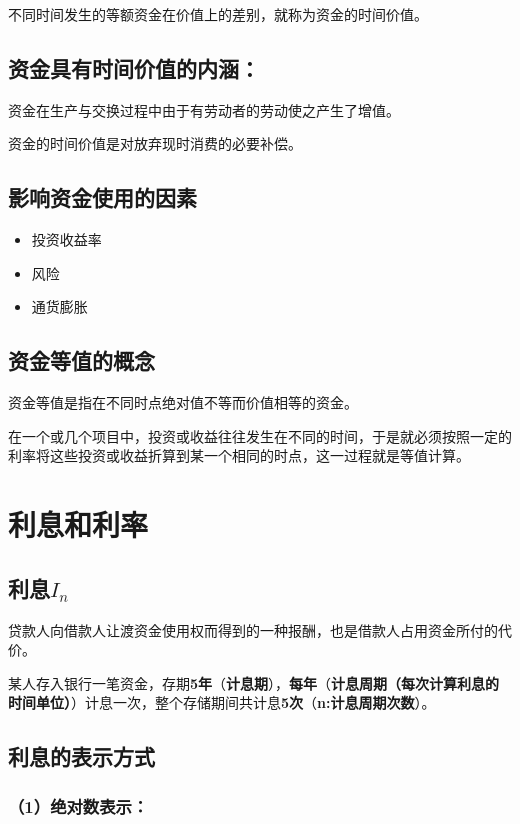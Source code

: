 \documentclass[12pt, a4paper, oneside]{ctexbook}
\begin{document}
不同时间发生的等额资金在价值上的差别，就称为资金的时间价值。

\subsection{资金具有时间价值的内涵：}

资金在生产与交换过程中由于有劳动者的劳动使之产生了增值。

资金的时间价值是对放弃现时消费的必要补偿。

\subsection{影响资金使用的因素}

\begin{itemize}
    \item 投资收益率
    \item 风险
    \item 通货膨胀
\end{itemize}

\subsection{资金等值的概念}

资金等值是指在不同时点绝对值不等而价值相等的资金。

在一个或几个项目中，投资或收益往往发生在不同的时间，于是就必须按照一定的利率将这些投资或收益折算到某一个相同的时点，这一过程就是等值计算。

\section{利息和利率}
\subsection{利息$I_n$}
贷款人向借款人让渡资金使用权而得到的一种报酬，也是借款人占用资金所付的代价。

某人存入银行一笔资金，存期\textbf{5年}（\textbf{计息期}），\textbf{每年}（\textbf{计息周期（每次计算利息的时间单位）}）计息一次，整个存储期间共计息\textbf{5次}（\textbf{n:计息周期次数}）。

\subsection{利息的表示方式}
\subsubsection{（1）绝对数表示：}
\end{document}
